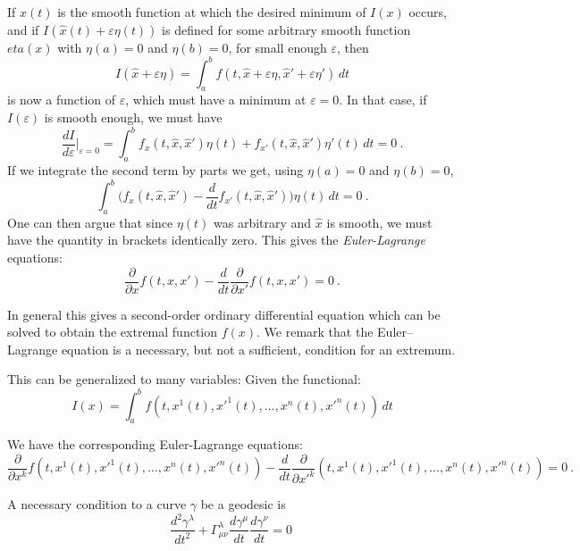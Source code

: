 If $\hat x(t)$ is the smooth function at
which the desired minimum of $I(x)$ occurs, and if $I(\hat x(t) + \varepsilon \eta(t))$ is
defined for some arbitrary smooth function $eta(x)$ with $\eta(a) = 0$ and 
$\eta(b) = 0$, for small enough $\varepsilon$, then
\[
  I(\hat x + \varepsilon \eta) = \int_a^b f(t,\hat x+\varepsilon \eta,\hat x'+\varepsilon \eta')\,dt
  \]
is now a function of $\varepsilon$, which must have a minimum at $\varepsilon = 0$.  In that
case, if $I(\varepsilon )$ is smooth enough, we must have 
\[
  \frac{dI}{d\varepsilon }|_{\varepsilon =0} = \int_a^b f_x(t,\hat x,\hat x')\eta(t) 
  + f_{x'}(t,\hat x,\hat x')\eta'(t)\,dt = 0\>.
  \]
If we integrate the second term by parts we get, using $\eta(a)= 0$
and $\eta(b) = 0$,
\[
  \int_a^b \Biggl( f_x(t,\hat x,\hat x') - \frac{d}{dt} f_{x'}(t,\hat x,\hat x')
           \Biggr)\eta(t)\,dt = 0\>.
  \]
One can then argue that since $\eta(t)$ was arbitrary and $\hat x$ is
smooth, we must have the
quantity in brackets identically zero.  This gives the \textit{
Euler-Lagrange\/} equations:
\begin{equation}
  \frac{\partial}{\partial x}f(t, x, x') - \frac{d}{dt} \frac{\partial}{\partial x'} f(t, x, x')  = 0\>. \label{EuLag}
\end{equation}

In general this gives a second-order ordinary differential equation which can be solved to obtain the extremal function $f(x)$. 
We remark that the Euler–Lagrange equation is a necessary, but not a sufficient, condition for an extremum.


This can be generalized to many variables:
Given the functional:
\[
  I(x) = \int_a^b f(t,x^1(t),x'^1(t), \dots, x^n(t),x'^n(t) )\, dt
  \]
  
We have the corresponding Euler-Lagrange equations:
\begin{equation}
  \frac{\partial}{\partial x^k}f(t,x^1(t),x'^1(t), \dots, x^n(t),x'^n(t) ) - \frac{d}{dt} \frac{\partial}{\partial x'^k} (t,x^1(t),x'^1(t), \dots, x^n(t),x'^n(t) )  = 0\>. \label{EuLag}
\end{equation}  


\begin{theorem} A necessary condition to a curve $\gamma$  be a geodesic is
\[\frac{d^2\gamma^\lambda }{dt^2} + \Gamma^{\lambda}_{\mu \nu }\frac{d\gamma^\mu }{dt}\frac{d\gamma^\nu }{dt} = 0\ \]
\end{theorem}



